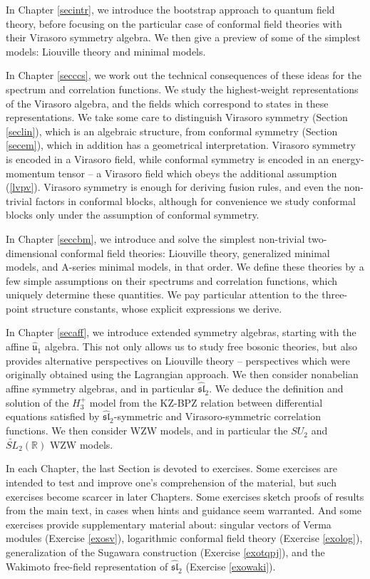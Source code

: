\documentclass[12pt,a4paper,notitlepage]{report}
\numberwithin{equation}{section}
\theoremstyle{break}
\begin{document}
In Chapter \ref{secintr}, we introduce the bootstrap approach to quantum field theory, before focusing on the particular case of conformal field theories with their Virasoro symmetry algebra. We then give a preview of some of the simplest models: Liouville theory and minimal models.

In Chapter \ref{secccs}, we work out the technical consequences of these ideas for the spectrum and correlation functions. We study the highest-weight representations of the Virasoro algebra, and the fields which correspond to states in these representations. We take some care to distinguish Virasoro symmetry (Section \ref{seclin}), which is an algebraic structure, from conformal symmetry (Section \ref{secem}), which in addition has a geometrical interpretation. Virasoro symmetry is encoded in a Virasoro field, while conformal symmetry is encoded in an energy-momentum tensor -- a Virasoro field which obeys the additional assumption (\ref{lvpv}). Virasoro symmetry is enough for deriving fusion rules, and even the non-trivial factors in conformal blocks, although for convenience we study conformal blocks only under the assumption of conformal symmetry. 

In Chapter \ref{seccbm}, we introduce and solve the simplest non-trivial two-dimensional conformal field theories: Liouville theory, generalized minimal models, and A-series minimal models, in that order. We define these theories by a few simple assumptions on their spectrums and correlation functions, which uniquely determine these quantities. We pay particular attention to the three-point structure constants, whose explicit expressions we derive. 

In Chapter \ref{secaff}, we introduce extended symmetry algebras, starting with the affine $\hat{\mathfrak{u}}_1$ algebra. This not only allows us to study free bosonic theories, but also provides alternative perspectives on Liouville theory -- perspectives which were originally obtained using the Lagrangian approach. We then consider nonabelian affine symmetry algebras, and in particular $\widehat{\mathfrak{sl}}_2$. We deduce the definition and solution of the $H_3^+$ model from the KZ-BPZ relation between differential equations satisfied by $\widehat{\mathfrak{sl}}_2$-symmetric and Virasoro-symmetric correlation functions. We then consider WZW models, and in particular the $SU_2$ and $\widetilde{SL}_2(\mathbb{R})$ WZW models. 

In each Chapter, the last Section is devoted to exercises. Some exercises are intended to test and improve one's comprehension of the material, but such exercises become scarcer in later Chapters. Some exercises sketch proofs of results from the main text, in cases when hints and guidance seem warranted. And some exercises provide supplementary material about: singular vectors of Verma modules (Exercise \ref{exosv}), logarithmic conformal field theory (Exercise \ref{exolog}), generalization of the Sugawara construction (Exercise \ref{exotqpj}), and the Wakimoto free-field representation of $\widehat{\mathfrak{sl}}_2$ (Exercise \ref{exowaki}).
\end{document}
